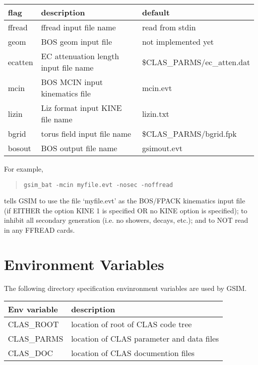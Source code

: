 \documentclass{article}
\begin{document}
\par
\begin{center}
\begin{tabular}{|l|l|l|} \hline
flag     &  description                            & default \\ \hline
ffread   &  ffread input file name                 & read from stdin  \\
geom     &  BOS geom input file                    & not implemented yet \\
ecatten  &  EC attenuation length input file name  & \$CLAS\_PARMS/ec\_atten.dat \\
mcin     &  BOS MCIN input kinematics file         & mcin.evt \\
lizin    &  Liz format input KINE file name        & lizin.txt \\
bgrid    &  torus field input file name            & \$CLAS\_PARMS/bgrid.fpk \\
bosout   &  BOS output file name                   & gsimout.evt \\ \hline
\end{tabular}
\end{center}

\noindent
For example,
\begin{quote}
{\tt gsim\_bat -mcin myfile.evt -nosec -noffread}
\end{quote}
tells GSIM to use the file `myfile.evt' as the BOS/FPACK kinematics
input file (if EITHER the option KINE 1 is specified OR no KINE option
is specified);  to inhibit all secondary generation (i.e. no
showers, decays, etc.);  and to NOT read in any FFREAD cards.


\newpage
\section{Environment Variables}
\label{environmentvariables}

The following directory specification envinronment variables are used
by GSIM.  \par
\begin{center}
\begin{tabular}{|l|l|} \hline
Env variable  &  description \\ \hline
CLAS\_ROOT    &  location of root of CLAS code tree \\
CLAS\_PARMS   &  location of CLAS parameter and data files \\
CLAS\_DOC     &  location of CLAS documention files \\ \hline
\end{tabular}
\end{center}
\end{document}
